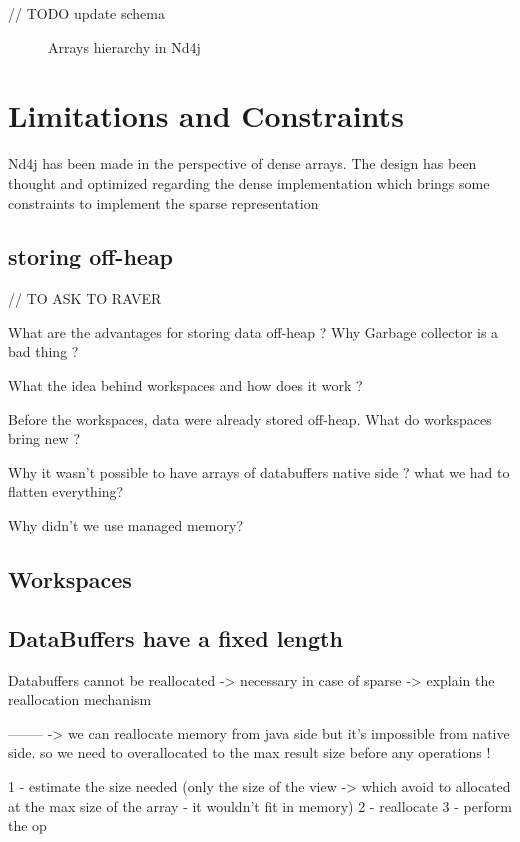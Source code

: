 // TODO update schema
 
\begin{figure}[H]
	\begin{center}
		\label{fig:hierarchy}
		\caption{Arrays hierarchy in Nd4j}
	\end{center}
\end{figure}


\section{Limitations and Constraints}

Nd4j has been made in the perspective of dense arrays. The design has been thought and optimized regarding the dense implementation which brings some constraints to implement the sparse representation
\subsection{storing off-heap}

// TO ASK TO RAVER

What are the advantages for storing data off-heap ? Why Garbage collector is a bad thing ?

What the idea behind workspaces and how does it work ?

Before the workspaces, data were already stored off-heap. What do workspaces bring new ? 

Why it wasn't possible to have arrays of databuffers native side ? what we had to flatten everything?

Why didn't we use managed memory?

\subsection{Workspaces}
\subsection{DataBuffers have a fixed length}

Databuffers cannot be reallocated -> necessary in case of sparse
-> explain the reallocation mechanism

--------
-> we can reallocate memory from java side but it's impossible from native side. so we need to overallocated to the max result size before any operations !

1 - estimate the size needed (only the size of the view -> which avoid to allocated at the max size of the array - it wouldn't fit in memory)
2 - reallocate
3 - perform the op

